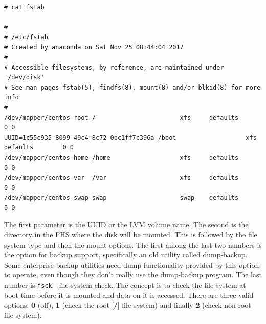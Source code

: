 \vspace{-15pt}
\begin{verbatim}
# cat fstab

#
# /etc/fstab
# Created by anaconda on Sat Nov 25 08:44:04 2017
#
# Accessible filesystems, by reference, are maintained under '/dev/disk'
# See man pages fstab(5), findfs(8), mount(8) and/or blkid(8) for more info
#
/dev/mapper/centos-root /                       xfs     defaults        0 0
UUID=1c55e935-8099-49c4-8c72-0bc1ff7c396a /boot                   xfs     defaults        0 0
/dev/mapper/centos-home /home                   xfs     defaults        0 0
/dev/mapper/centos-var  /var                    xfs     defaults        0 0
/dev/mapper/centos-swap swap                    swap    defaults        0 0
\end{verbatim}
\vspace{-10pt}

\noindent
The first parameter is the UUID or the LVM volume name. The second is the directory in the FHS where the disk will be mounted. This is followed by the file system type and then the mount options. The first among the last two numbers is the option for backup support, specifically an old utility called dump-backup. Some enterprise backup utilities need dump functionality provided by this option to operate, even though they don't really use the dump-backup program. The last number is \verb|fsck| - file system check. The concept is to check the file system at boot time before it is mounted and data on it is accessed. There are three valid options: \textbf{0} (off), \textbf{1} (check the root [\verb|/|] file system) and finally \textbf{2} (check non-root file system). 

